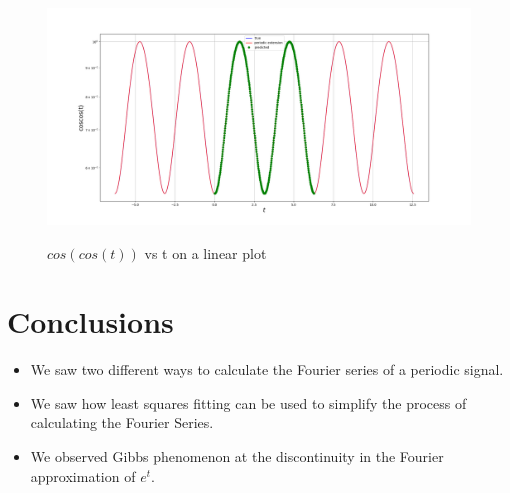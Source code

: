 \documentclass[11pt, a4paper]{article}
\begin{document}
\begin{figure}[!tbh]
   	\centering
   	\includegraphics[scale=0.25]{Figure_22.png}
   	\label{fig:42}
   	\caption{$cos(cos(t))$ vs t on a linear plot}

   \end{figure}
\section{Conclusions}
\begin{itemize}
\item We saw two different ways to calculate the Fourier series of a periodic signal.
\item We saw how least squares fitting can be used to simplify the process of calculating the Fourier Series.
\item We observed Gibbs phenomenon at the discontinuity in the Fourier approximation of $e^{t}$.
\end{itemize}
\end{document}
